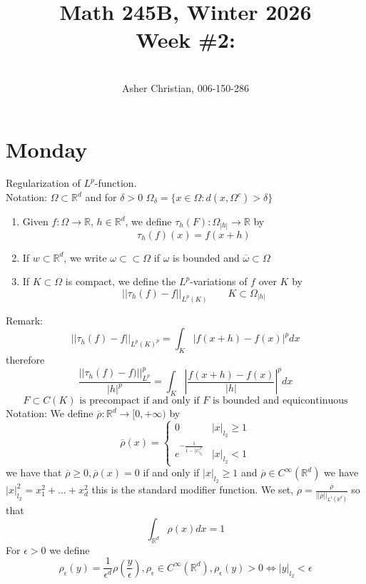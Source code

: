 \documentclass[11pt]{article}
\newcommand{\cnum}{Math 245B}
\newcommand{\ced}{Winter 2026}
\newcommand{\ctitle}[4]{\title{\vspace{-0.5in}\cnum, \ced\\Week #1: #2}\author{\vspace{-0.35in}\\#3, #4}}
\begin{document}
\ctitle{\#2}{}{Asher Christian}{006-150-286}
\date{}
\maketitle

\section{Monday}
Regularization of $L^{p}$-function.\\
Notation: $\Omega \subset \mathbb{R}^{d}$ and for $\delta > 0$ $\Omega_\delta = \{ x \in \Omega : d(x,\Omega^{c}) > \delta\}$
\begin{enumerate}
    \item Given $f : \Omega \rightarrow \mathbb{R}$, $h \in \mathbb{R}^{d}$, we define $\tau_h(F) : \Omega_|h| \rightarrow \mathbb{R}$ by
        \[
        \tau_h(f)(x) = f(x + h)
        \] 
    \item If $w \subset \mathbb{R}^{d}$, we write $\omega \subset \subset \Omega$ if $\omega$ is bounded
        and  $\overline{ \omega} \subset \Omega$ 
    \item If $K \subset \Omega$ is compact, we define the $L^{p}$-variations of $f$ over  $K$ by
         \[
             ||\tau_h(f) - f||_{L^{p}(K)} \qquad K \subset \Omega_{|h|}
        \] 
\end{enumerate}
Remark:  
\[
    ||\tau_h(f) - f||_{L^{p}(K)^{p}} = \int_{K}^{}|f(x+h) - f(x)|^{p}dx
\] 
therefore
\[
    \frac{||\tau_h(f) - f)||_{L^{p}}^{p}}{|h|^{p}} = \int_{K}^{} |\frac{f(x+h) - f(x)}{|h|}|^{p} dx
\] 
\[
    F \subset C(K) \text{ is precompact if and only if $F$ is bounded and equicontinuous}
\] 
Notation: We define $\overline{ \rho} : \mathbb{R}^{d} \rightarrow [0, +\infty)$ by
\[
\overline{ \rho }(x) = 
\begin{cases}
    0 & |x|_{l_2} \ge 1 \\
    e^{-\frac{1}{1-|x|_{l_2}^2}} & |x|_{l_2} < 1
\end{cases}
\] 
we have that $\overline{ \rho} \ge 0, \overline{ \rho}(x) = 0$ if and only if $|x|_{l_2} \ge 1$
and $\overline{ \rho} \in C^{\infty}( \mathbb{R}^{d})$ we have $|x|_{l_2}^2 = x_1^2 + \dots + x_d^2$ this is the standard modifier function.
We set, $\rho = \frac{\overline{ \rho}}{|| \overline{ \rho}||_{L^{1}( \mathbb{R}^{d})}}$ so that
\[
\int_{ \mathbb{R}^{d}}^{} \rho(x) dx = 1
\] 
For $\epsilon > 0$ we define
\[
    \rho_\epsilon(y) = \frac{1}{\epsilon^{d}} \rho(\frac{y}{\epsilon}) , \rho_\epsilon \in C^{\infty}( \mathbb{R}^{d}), \rho_\epsilon(y) > 0 \iff |y|_{l_2} < \epsilon
\] 
\end{document}
